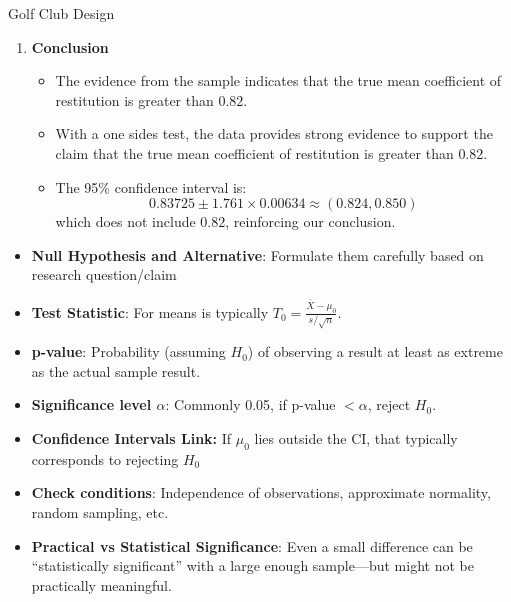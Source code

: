 \documentclass[10pt, total={6in, 8in}]{extarticle}
\begin{document}
\begin{examplebox}{Golf Club Design}{}
\begin{enumerate}
        \item \textbf{Conclusion}
              \begin{itemize}
                  \item The evidence from the sample indicates that the true mean coefficient of restitution is greater than $0.82$.
                  \item With a one sides test, the data provides strong evidence to support the claim that the true mean coefficient of restitution is greater than $0.82$.
                  \item The 95\% confidence interval is:
                        $$0.83725 \pm 1.761 \times 0.00634 \approx (0.824, 0.850)$$
                        which does not include $0.82$, reinforcing our conclusion.
              \end{itemize}
    \end{enumerate}
\end{examplebox}
\begin{takeaway-box}{}{}
\begin{itemize}
    \item \textbf{Null Hypothesis and Alternative}: Formulate them carefully based on research question/claim
    \item \textbf{Test Statistic}: For means is typically $T_0 = \frac{\bar{X} - \mu_0}{s/\sqrt{n}}$.
    \item \textbf{p-value}: Probability (assuming $H_0$) of observing a result at least as extreme as the actual sample result.
    \item \textbf{Significance level $\alpha$}: Commonly 0.05, if p-value $< \alpha$, reject $H_0$.
    \item \textbf{Confidence Intervals Link:} If $\mu_0$ lies outside the CI, that typically corresponds to rejecting $H_0$
    \item \textbf{Check conditions}: Independence of observations, approximate normality, random sampling, etc.
    \item \textbf{Practical vs Statistical Significance}: Even a small difference can be “statistically significant” with a large enough sample—but might not be practically meaningful.
\end{itemize}
\end{takeaway-box}
\end{document}
